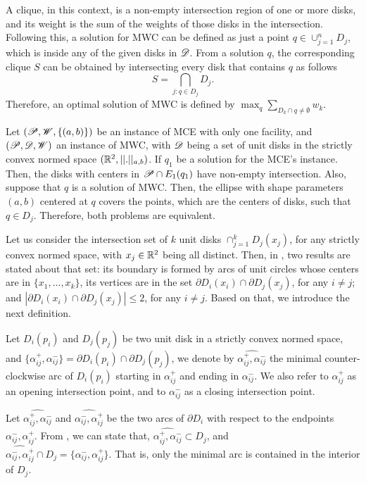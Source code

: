 A clique, in this context, is a non-empty intersection region of one or more disks, and its weight is the sum of the weights of those disks in the intersection.
Following this, a solution for MWC can be defined as just a point $q\in\cup_{j=1}^n D_j$, which is inside any of the given disks in $\mathscr{D}$.
From a solution $q$, the corresponding clique $S$ can be obtained by intersecting every disk that contains $q$ as follows
\begin{equation*}
	S = \bigcap_{j : q \in D_j} D_j.
\end{equation*}
Therefore, an optimal solution of MWC is defined by	$\max_{q} \sum_{D_k \cap q \neq \emptyset} w_k$. 

Let $(\mathscr{P}, \mathscr{W}, \{(a, b)\})$ be an instance of MCE with only one facility, and $(\mathscr{P}, \mathscr{D}, \mathscr{W})$ an instance of MWC, with $\mathscr{D}$ being a set of unit disks in the strictly convex normed space $(\mathbb{R}^2, ||.||_{a,b})$.
If $q_1$ be a solution for the MCE's instance. Then, the disks with centers in $\mathscr{P} \cap E_1(q_1)$ have non-empty intersection.
Also, suppose that $q$ is a solution of MWC. Then, the ellipse with shape parameters $(a, b)$ centered at $q$ covers the points, which are the centers of disks, such that $q \in D_j$.
Therefore, both problems are equivalent.

Let us consider the intersection set of $k$ unit disks $\cap_{j=1}^k D_j(x_j)$, for any strictly convex normed space, with $x_j \in \mathbb{R}^2$ being all distinct.
Then, in , two results are stated about that set: its boundary is formed by arcs of unit circles whose centers are in $\{x_1, \dots, x_k\}$, its vertices are in the set $\partial D_i(x_i) \cap \partial D_j(x_j)$, for any $i \neq j$; and $|\partial D_i(x_i) \cap \partial D_j(x_j)| \le 2$, for any $i\neq j$. 
Based on that, we introduce the next definition.

\begin{definicao}
	Let $D_i(p_i)$ and $D_j(p_j)$ be two unit disk in a strictly convex normed space, and $\{\alpha_{ij}^+, \alpha_{ij}^-\}=\partial D_i(p_i) \cap \partial D_j(p_j)$, we denote by $\widehat{\alpha_{ij}^+, \alpha_{ij}^-}$ the minimal counter-clockwise arc of $D_i(p_i)$ starting in $\alpha_{ij}^+$ and ending in $\alpha_{ij}^-$. We also refer to $\alpha_{ij}^+$ as an opening intersection point, and to $\alpha_{ij}^-$ as a closing intersection point.
\end{definicao}
Let $\widehat{\alpha_{ij}^+, \alpha_{ij}^-}$ and $\widehat{\alpha_{ij}^-, \alpha_{ij}^+}$ be the two arcs of $\partial D_i$ with respect to the endpoints $\alpha_{ij}^-, \alpha_{ij}^+$.
From , we can state that, $\widehat{\alpha_{ij}^+, \alpha_{ij}^-}\subset D_j$, and\\ $\widehat{\alpha_{ij}^-, \alpha_{ij}^+} \cap D_j = \{\alpha_{ij}^-, \alpha_{ij}^+\}$. That is, only the minimal arc is contained in the interior of $D_j$.


